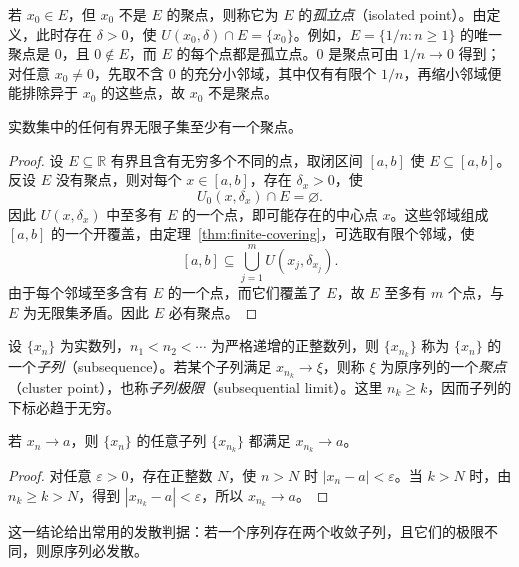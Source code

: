 \documentclass[UTF8,12pt,a4paper,fontset=fandol]{ctexbook}
\begin{document}
若 $x_0\in E$，但 $x_0$ 不是 $E$ 的聚点，则称它为 $E$ 的\emph{孤立点}（isolated point）。由定义，此时存在 $\delta>0$，使 $U(x_0,\delta)\cap E=\{x_0\}$。例如，$E=\{1/n:n\geq1\}$ 的唯一聚点是 $0$，且 $0\notin E$，而 $E$ 的每个点都是孤立点。$0$ 是聚点可由 $1/n\to0$ 得到；对任意 $x_0\neq0$，先取不含 $0$ 的充分小邻域，其中仅有有限个 $1/n$，再缩小邻域便能排除异于 $x_0$ 的这些点，故 $x_0$ 不是聚点。

\begin{theorem}[聚点原理]
\label{thm:accumulation-point-principle}
实数集中的任何有界无限子集至少有一个聚点。
\end{theorem}

\begin{proof}
设 $E\subseteq\mathbb{R}$ 有界且含有无穷多个不同的点，取闭区间 $[a,b]$ 使 $E\subseteq[a,b]$。反设 $E$ 没有聚点，则对每个 $x\in[a,b]$，存在 $\delta_x>0$，使
\[
    U_0(x,\delta_x)\cap E=\varnothing.
\]
因此 $U(x,\delta_x)$ 中至多有 $E$ 的一个点，即可能存在的中心点 $x$。这些邻域组成 $[a,b]$ 的一个开覆盖，由定理~\ref{thm:finite-covering}，可选取有限个邻域，使
\[
    [a,b]\subseteq\bigcup_{j=1}^{m}U(x_j,\delta_{x_j}).
\]
由于每个邻域至多含有 $E$ 的一个点，而它们覆盖了 $E$，故 $E$ 至多有 $m$ 个点，与 $E$ 为无限集矛盾。因此 $E$ 必有聚点。
\end{proof}

\begin{definition}
\label{def:subsequence-and-sequence-cluster-point}
设 $\{x_n\}$ 为实数列，$n_1<n_2<\cdots$ 为严格递增的正整数列，则 $\{x_{n_k}\}$ 称为 $\{x_n\}$ 的一个\emph{子列}（subsequence）。若某个子列满足 $x_{n_k}\to\xi$，则称 $\xi$ 为原序列的一个\emph{聚点}（cluster point），也称\emph{子列极限}（subsequential limit）。这里 $n_k\geq k$，因而子列的下标必趋于无穷。
\end{definition}

\begin{theorem}[收敛序列的子列]
\label{thm:subsequence-of-convergent-sequence}
若 $x_n\to a$，则 $\{x_n\}$ 的任意子列 $\{x_{n_k}\}$ 都满足 $x_{n_k}\to a$。
\end{theorem}

\begin{proof}
对任意 $\varepsilon>0$，存在正整数 $N$，使 $n>N$ 时 $|x_n-a|<\varepsilon$。当 $k>N$ 时，由 $n_k\geq k>N$，得到 $|x_{n_k}-a|<\varepsilon$，所以 $x_{n_k}\to a$。
\end{proof}

这一结论给出常用的发散判据：若一个序列存在两个收敛子列，且它们的极限不同，则原序列必发散。
\end{document}
